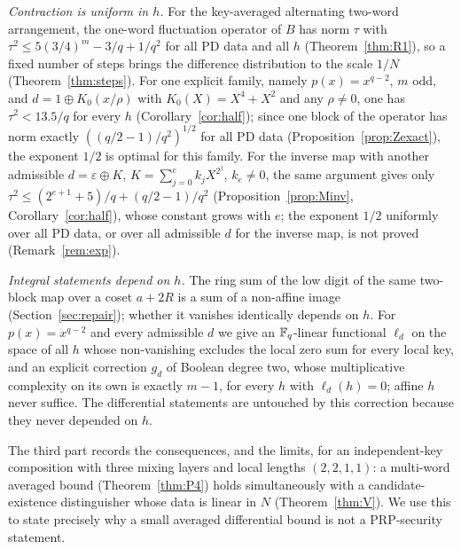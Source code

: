 \emph{Contraction is uniform in $h$.} For the key-averaged alternating two-word arrangement, the one-word fluctuation
operator of $B$ has norm $\tau$ with $\tau^2\le5(3/4)^m-3/q+1/q^2$ for all PD data and all $h$ (Theorem~\ref{thm:R1}), so a
fixed number of steps brings the difference distribution to the scale $1/N$ (Theorem~\ref{thm:steps}). For one explicit family,
namely $p(x)=x^{q-2}$, $m$ odd, and $d=1\oplus K_0(x/\rho)$ with $K_0(X)=X^4+X^2$ and any $\rho\ne0$, one has $\tau^2<13.5/q$ for every $h$
(Corollary~\ref{cor:half}); since one block of the operator has norm exactly $((q/2-1)/q^2)^{1/2}$ for all PD data
(Proposition~\ref{prop:Zexact}), the exponent $1/2$ is optimal for this family. For the inverse map with another admissible $d=\varepsilon\oplus K$,
$K=\sum_{j=0}^ek_jX^{2^j}$, $k_e\ne0$, the same argument gives only $\tau^2\le(2^{e+1}+5)/q+(q/2-1)/q^2$
(Proposition~\ref{prop:Minv}, Corollary~\ref{cor:half}), whose constant grows with $e$; the exponent $1/2$ uniformly over all PD
data, or over all admissible $d$ for the inverse map, is not proved (Remark~\ref{rem:exp}).

\emph{Integral statements depend on $h$.} The ring sum of the low digit of the same two-block map
over a coset $a+2R$ is a sum of a non-affine image (Section~\ref{sec:repair}); whether it vanishes
identically depends on $h$. For $p(x)=x^{q-2}$ and every admissible $d$ we give an $\mathbb{F}_q$-linear functional
$\ell_d$ on the space of all $h$ whose non-vanishing excludes the local zero sum for every local key, and an
explicit correction $g_d$ of Boolean degree two, whose multiplicative complexity on its own is exactly $m-1$, for every $h$ with
$\ell_d(h)=0$; affine $h$ never suffice. The differential statements are
untouched by this correction because they never depended on $h$.

The third part records the consequences, and the limits, for an independent-key composition with
three mixing layers and local lengths $(2,2,1,1)$: a multi-word averaged bound
(Theorem~\ref{thm:P4}) holds simultaneously with a candidate-existence distinguisher whose data
is linear in $N$ (Theorem~\ref{thm:V}). We use this to state precisely why a small averaged
differential bound is not a PRP-security statement.

